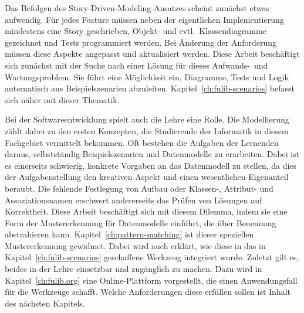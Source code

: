 Das Befolgen des Story-Driven-Modeling-Ansatzes scheint zunächst etwas aufwendig.
Für jedes Feature müssen neben der eigentlichen Implementierung mindestens eine Story geschrieben, Objekt- und evtl.\ Klassendiagramme gezeichnet und Tests programmiert werden.
Bei Änderung der Anforderung müssen diese Aspekte angepasst und aktualisiert werden.
Diese Arbeit beschäftigt sich zunächst mit der Suche nach einer Lösung für dieses Aufwands-\ und Wartungsproblem.
Sie führt eine Möglichkeit ein, Diagramme, Tests und Logik automatisch aus Beispielszenarien abzuleiten.
Kapitel~\ref{ch:fulib-scenarios} befasst sich näher mit dieser Thematik.

Bei der Softwareentwicklung spielt auch die Lehre eine Rolle.
Die Modellierung zählt dabei zu den ersten Konzepten, die Studierende der Informatik in diesem Fachgebiet vermittelt bekommen.
Oft bestehen die Aufgaben der Lernenden daraus, selbstständig Beispielszenarien und Datenmodelle zu erarbeiten.
Dabei ist es einerseits schwierig, konkrete Vorgaben an das Datenmodell zu stellen, da dies der Aufgabenstellung den kreativen Aspekt und einen wesentlichen Eigenanteil beraubt.
Die fehlende Festlegung von Aufbau oder Klassen-, Attribut- und Assoziationsnamen erschwert andererseits das Prüfen von Lösungen auf Korrektheit.
Diese Arbeit beschäftigt sich mit diesem Dilemma, indem sie eine Form der Mustererkennung für Datenmodelle einführt, die über Benennung abstrahieren kann.
Kapitel~\ref{ch:pattern-matching} ist dieser speziellen Mustererkennung gewidmet.
Dabei wird auch erklärt, wie diese in das in Kapitel~\ref{ch:fulib-scenarios} geschaffene Werkzeug integriert wurde.
Zuletzt gilt es, beides in der Lehre einsetzbar und zugänglich zu machen.
Dazu wird in Kapitel~\ref{ch:fulib.org} eine Online-Plattform vorgestellt, die einen Anwendungsfall für die Werkzeuge schafft.
Welche Anforderungen diese erfüllen sollen ist Inhalt des nächsten Kapitels.
